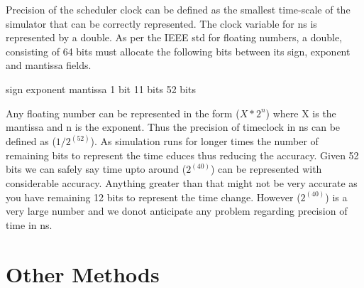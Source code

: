 Precision of the scheduler clock can be defined as the smallest time-scale 
of the simulator that can be correctly represented. The clock variable for 
ns is represented by a double. As per the IEEE std for floating numbers, 
a double, consisting of 64 bits must allocate the following bits between 
its sign, exponent and mantissa fields.

\begin{program}

sign     exponent      mantissa
 1 bit   11 bits        52 bits
\end{program}

Any floating number can be represented in the form ($X * 2^n$) where 
X is the mantissa and n is the exponent. Thus the precision of timeclock in ns can be defined as ($1/2^(52)$).
As simulation runs for longer times the number of remaining bits to represent 
the time educes thus reducing the accuracy. Given 52 bits we can safely say 
time upto around ($2^(40)$) can be represented with considerable accuracy. 
Anything greater than that might not be very accurate as you have remaining 12 
bits to represent the time change. However ($2^(40)$) is a very large number and 
we donot anticipate any problem regarding precision of time in ns.


\section{Other Methods}
\label{sec:other}

